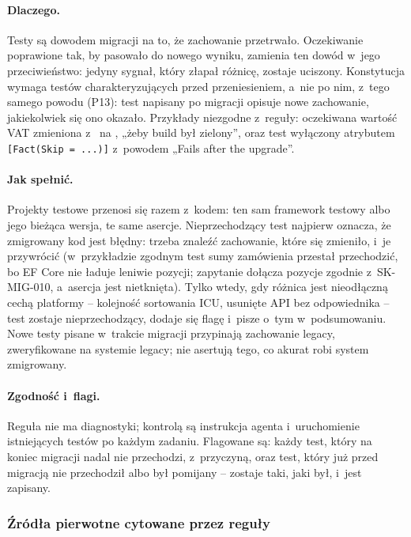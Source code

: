 \paragraph{Dlaczego.} Testy są dowodem migracji na to, że zachowanie przetrwało.
Oczekiwanie poprawione tak, by pasowało do nowego wyniku, zamienia ten dowód w~jego
przeciwieństwo: jedyny sygnał, który złapał różnicę, zostaje uciszony. Konstytucja wymaga
testów charakteryzujących przed przeniesieniem, a~nie po nim, z~tego samego powodu (P13):
test napisany po migracji opisuje nowe zachowanie, jakiekolwiek się ono okazało. Przykłady
niezgodne z~reguły: oczekiwana wartość VAT zmieniona z~ na
, „żeby build był zielony”, oraz test wyłączony atrybutem
\texttt{[Fact(Skip = ...)]} z~powodem „Fails after the upgrade”.

\paragraph{Jak spełnić.} Projekty testowe przenosi się razem z~kodem: ten sam framework
testowy albo jego bieżąca wersja, te same asercje. Nieprzechodzący test najpierw oznacza, że
zmigrowany kod jest błędny: trzeba znaleźć zachowanie, które się zmieniło, i~je przywrócić
(w~przykładzie zgodnym test sumy zamówienia przestał przechodzić, bo EF Core nie ładuje
leniwie pozycji; zapytanie dołącza pozycje zgodnie z~SK-MIG-010, a~asercja jest nietknięta).
Tylko wtedy, gdy różnica jest nieodłączną cechą platformy -- kolejność sortowania ICU,
usunięte API bez odpowiednika -- test zostaje nieprzechodzący, dodaje się flagę i~pisze o~tym
w~podsumowaniu. Nowe testy pisane w~trakcie migracji przypinają zachowanie legacy,
zweryfikowane na systemie legacy; nie asertują tego, co akurat robi system zmigrowany.

\paragraph{Zgodność i~flagi.} Reguła nie ma diagnostyki; kontrolą są instrukcja agenta
i~uruchomienie istniejących testów po każdym zadaniu. Flagowane są: każdy test, który na
koniec migracji nadal nie przechodzi, z~przyczyną, oraz test, który już przed migracją nie
przechodził albo był pomijany -- zostaje taki, jaki był, i~jest zapisany.


\subsubsection{Źródła pierwotne cytowane przez reguły}\label{sec:standardy-referencje}


